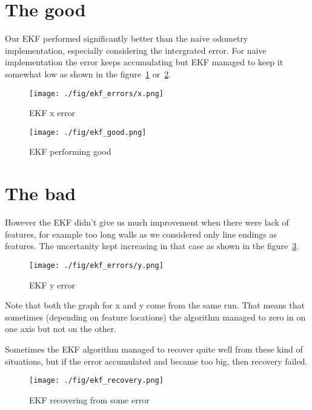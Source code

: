 \documentclass[12pt, a4paper, onecolumn]{article}
\begin{document}
\maketitle

\section{The good}
Our EKF performed significantly better than the naive odometry implementation, especially considering the intergrated error.
For naive implementation the error keeps accumulating but EKF managed to keep it somewhat low as shown in the figure~\ref{fig:err_x} or~\ref{fig:ekf_good}.

\begin{figure}[h!]
  \begin{center}
    \texttt{[image: ./fig/ekf\_errors/x.png]}
  \end{center}
  \caption{EKF x error}
  \label{fig:err_x}
\end{figure}

\begin{figure}[h!]
  \begin{center}
    \texttt{[image: ./fig/ekf\_good.png]}
  \end{center}
  \caption{EKF performing good}
  \label{fig:ekf_good}
\end{figure}


\newpage
\section{The bad}
However the EKF didn't give us much improvement when there were lack of features, for example too long walls as we considered only line endings as features.
The uncertanity kept increasing in that case as shown in the figure~\ref{fig:err_y}.
\begin{figure}[h!]
  \begin{center}
    \texttt{[image: ./fig/ekf\_errors/y.png]}
  \end{center}
  \caption{EKF y error}
  \label{fig:err_y}
\end{figure}
Note that both the graph for x and y come from the same run. That means that sometimes (depending on feature locations) the algorithm managed
to zero in on one axis but not on the other.

Sometimes the EKF algorithm managed to recover quite well from these kind of situations, but if the error accumulated and became too big, then recovery failed.
\begin{figure}[h!]
  \begin{center}
    \texttt{[image: ./fig/ekf\_recovery.png]}
  \end{center}
  \caption{EKF recovering from some error}
  \label{fig:ekf_recovery}
\end{figure}
\end{document}
